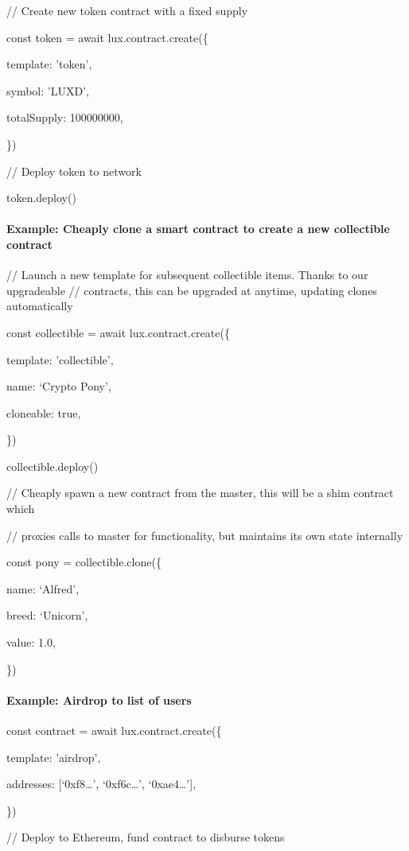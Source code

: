 \documentclass[11pt]{article}
\begin{document}
// Create new token contract with a fixed supply


const token = await lux.contract.create(\{


template: 'token',


symbol:   'LUXD',


totalSupply: 100000000,


\})


// Deploy token to network


token.deploy()


\paragraph{Example: Cheaply clone a smart contract to create a new collectible contract}

// Launch a new template for subsequent collectible items. Thanks to our upgradeable // contracts, this can be upgraded at anytime, updating clones automatically


const collectible = await lux.contract.create(\{


template: 'collectible',


name: `Crypto Pony',


cloneable: true,


\})


collectible.deploy()


// Cheaply spawn a new contract from the master, this will be a shim contract which


// proxies calls to master for functionality, but maintains its own state internally


const pony = collectible.clone(\{


name: `Alfred',


breed: `Unicorn',


value: 1.0,


\})


\paragraph{Example: Airdrop to list of users}

const contract = await lux.contract.create(\{


template: 'airdrop',


addresses: [`0xf8\ldots{}', `0xf6c\ldots{}', `0xae4\ldots{}'],


\})


// Deploy to Ethereum, fund contract to disburse tokens
\end{document}
